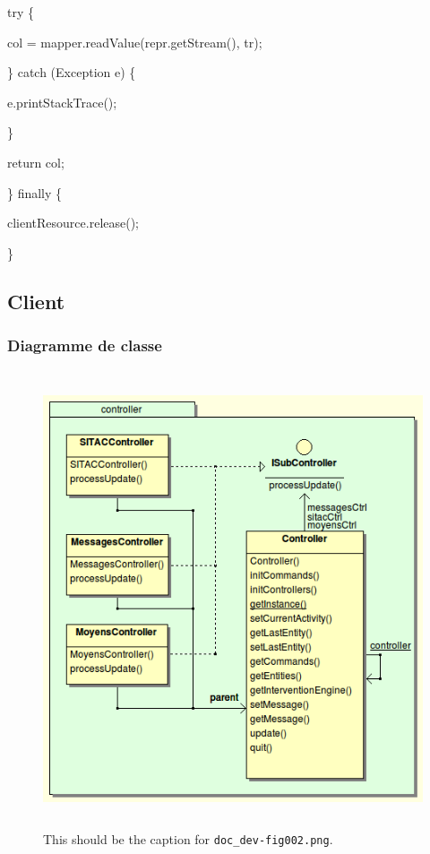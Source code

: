 \documentclass{article}
\begin{document}
{\color{color01} try \{}

{\color{color01} col = mapper.readValue(repr.getStream(), tr);}

\parindent=54pt
{\color{color01} \} catch (Exception e) \{}

\parindent=0pt
{\color{color01} e.printStackTrace();}

\parindent=54pt
{\color{color01} \}}

\vspace{13pt}
\parindent=0pt
{\color{color01} return col;}

\vspace{13pt}
\parindent=36pt
{\color{color01} \} finally \{}

\parindent=0pt
{\color{color01} clientResource.release();}

\parindent=36pt
{\color{color01} \}\label{h.5bosr7k47ipl}}

\vspace{31pt}
\subsection*{{\large {\color{color01} \textbf{Client\label{h.28dwwk54l87g}}}}}

\vspace{14pt}
\subsubsection*{{\color{color02} \textbf{Diagramme de classe}}}

\begin{figure}[htbp]
\begin{center}
\includegraphics[width=357pt, height=382pt]{doc_dev-fig002.png}
\caption{This should be the caption for \texttt{doc\_dev-fig002.png}.}
\end{center}
\end{figure}
\end{document}
